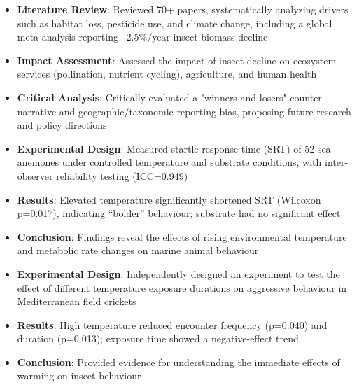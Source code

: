 \documentclass{my-resume}
\begin{document}
\begin{itemize}[parsep=0.2ex]
  \item \textbf{Literature Review}: Reviewed 70+ papers, systematically analyzing drivers such as habitat loss, pesticide use, and climate change, including a global meta-analysis reporting ~2.5\%/year insect biomass decline
  \item \textbf{Impact Assessment}: Assessed the impact of insect decline on ecosystem services (pollination, nutrient cycling), agriculture, and human health
  \item \textbf{Critical Analysis}: Critically evaluated a "winners and losers" counter-narrative and geographic\slash taxonomic reporting bias, proposing future research and policy directions
\end{itemize}

\begin{itemize}[parsep=0.2ex]
  \item \textbf{Experimental Design}: Measured startle response time (SRT) of 52 sea anemones under controlled temperature and substrate conditions, with inter-observer reliability testing (ICC=0.949)
  \item \textbf{Results}: Elevated temperature significantly shortened SRT (Wilcoxon p=0.017), indicating ``bolder'' behaviour; substrate had no significant effect
  \item \textbf{Conclusion}: Findings reveal the effects of rising environmental temperature and metabolic rate changes on marine animal behaviour
\end{itemize}

\begin{itemize}[parsep=0.2ex]
  \item \textbf{Experimental Design}: Independently designed an experiment to test the effect of different temperature exposure durations on aggressive behaviour in Mediterranean field crickets
  \item \textbf{Results}: High temperature reduced encounter frequency (p=0.040) and duration (p=0.013); exposure time showed a negative-effect trend
  \item \textbf{Conclusion}: Provided evidence for understanding the immediate effects of warming on insect behaviour
\end{itemize}
\end{document}
